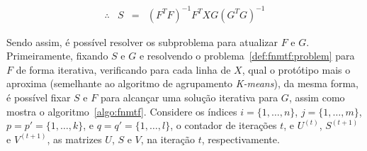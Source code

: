 \documentclass[
    12pt,                %
    oneside,            %
    a4paper,            %
    english,            %
    brazil                %
    ]{abntex2ppgsi}
\begin{document}
\begin{equation}
\label{eq:fnmtf:updateS}
    \begin{array}{lclcl}
        \therefore & S & = & (F^T F)^{-1} F^T X G (G^T G)^{-1}
    \end{array}
\end{equation}

Sendo assim, é possível resolver os subproblema para atualizar $F$ e $G$.
Primeiramente, fixando $S$ e $G$ e resolvendo o problema~\ref{def:fnmtf:problem} para $F$ de forma iterativa, verificando para cada linha de $X$, qual o protótipo mais o aproxima (semelhante ao algoritmo de agrupamento \textit{K-means}), da mesma forma, é possível fixar $S$ e $F$ para alcançar uma solução iterativa para $G$, assim como mostra o algoritmo~\ref{algo:fnmtf}.
Considere os índices $i = \{1, \dots, n\}$, $j = \{1, \dots, m\}$, $p = p' = \{1, \dots, k\}$, e $q = q' = \{1, \dots, l\}$, o contador de iterações $t$, e $U^{(t)}$, $S^{(t+1)}$ e $V^{(t+1)}$, as matrizes $U$, $S$ e $V$, na iteração $t$, respectivamente.
\end{document}
